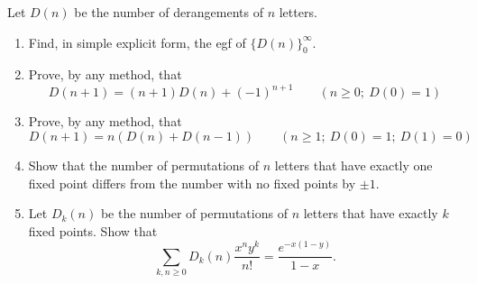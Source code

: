 \begin{exercise}
    \label{ex:2-27}
    Let $D(n)$ be the number of derangements of $n$ letters.
    \begin{enumerate}[label=(\alph*)]
        \item Find, in simple explicit form, the egf of $\{D(n)\}_0^\infty$.
        \item Prove, by any method, that
        \[
            D(n+1)=(n+1)D(n)+ (-1)^{n+1} \qquad (n\geq0;\ D(0)=1)
        \]
        \item Prove, by any method, that
        \[
            D(n+1) = n(D(n) + D(n-1)) \qquad (n\geq 1;\ D(0)=1;\ D(1)=0)
        \]
        \item Show that the number of permutations of $n$ letters that have exactly one fixed point differs from the number with no fixed points by $\pm 1$.
        \item Let $D_k(n)$ be the number of permutations of $n$ letters that have exactly $k$ fixed points. Show that
        \[
            \sum_{k,n\geq0} D_k(n)\frac{x^ny^k}{n!} = \frac{e^{-x(1-y)}}{1-x}.  
        \]
    \end{enumerate}
\end{exercise}

